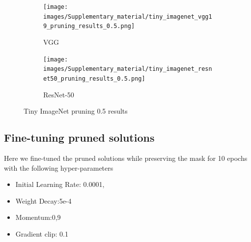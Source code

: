 \begin{figure}[h]
 \centering
     \begin{subfigure}[b]{\columnwidth}
    \texttt{[image: images/Supplementary\_material/tiny\_imagenet\_vgg19\_pruning\_results\_0.5.png]}
    \caption{VGG}
    \label{subfig:vgg19CIfar10PR0.5}
     \end{subfigure}
      \hfill
     \begin{subfigure}[b]{\columnwidth}
    \texttt{[image: images/Supplementary\_material/tiny\_imagenet\_resnet50\_pruning\_results\_0.5.png]}
    \caption{ResNet-50}
    \label{subfig:resenet50CIfar10PR0.5}
     \end{subfigure}
     \caption{ Tiny ImageNet pruning 0.5 results}
    \label{fig:pr_0.8_tiny_imagenet}
\end{figure}



\subsection*{Fine-tuning pruned solutions}
\label{subsec:Fine_tuning_solutions}
Here we fine-tuned the pruned solutions while preserving the mask for 10 epochs with the following hyper-parameters
\begin{itemize}
  \item Initial Learning Rate: 0.0001,
  \item Weight Decay:5e-4
  \item Momentum:0,9
  \item Gradient clip: 0.1
\end{itemize}

